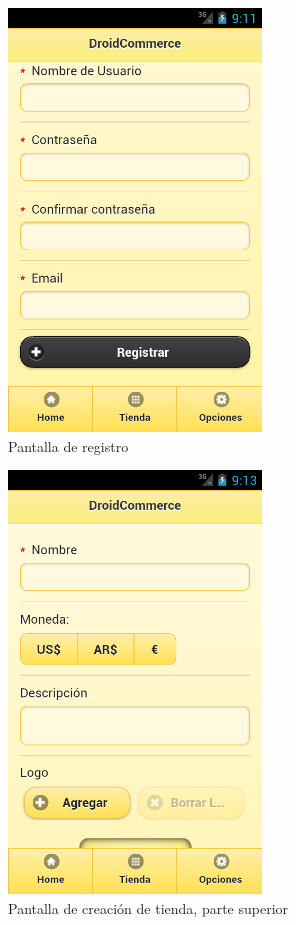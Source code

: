 \begin{figure}
  \centering
    \includegraphics[width=0.6\textwidth]{imagenes/capturas/registro2.png}
        \caption{Pantalla de registro}
    \label{fig:login}
\end{figure}

\begin{figure}
  \centering
    \includegraphics[width=0.6\textwidth]{imagenes/capturas/crear-tienda1.png}
        \caption{Pantalla de creación de tienda, parte superior}
    \label{fig:crear-tienda-1}
\end{figure}

